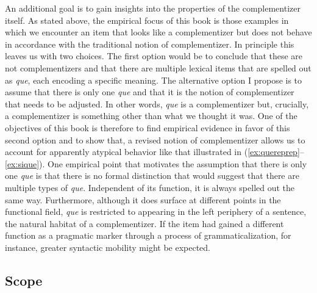 An additional goal is to gain insights into the properties of the complementizer itself. As stated above, the empirical focus of this book is those examples in which we encounter an item that looks like a complementizer but does not behave in accordance with the traditional notion of  complementizer. In principle this leaves us with  two choices. The first option would be to conclude that these are not complementizers and  that there are multiple lexical items that are spelled out as \emph{que}, each encoding a specific meaning. The alternative option I propose  is to assume that there is only one \emph{que}  and that it is the notion of complementizer that needs to be adjusted.  In other words,  \emph{que}  is a complementizer but, crucially, a complementizer is something other than what we thought it was. One of the objectives of this book is therefore to find empirical evidence in favor of this second option and to show that, a revised notion of complementizer allows us to account for  apparently atypical behavior like that illustrated in (\ref{ex:quereprep}--\ref{ex:sique}).  
One  empirical point that motivates the assumption that there is only one \emph{que} is that there is no  formal distinction that would suggest that there are multiple types of \emph{que}. Independent of its function, it is always spelled out the same way. Furthermore, although it does surface at different points in the functional field, \emph{que} is restricted to appearing in the left periphery of a sentence,  the natural habitat of a complementizer. If the item had gained a different function as a pragmatic marker through a process of grammaticalization, for instance,  greater syntactic mobility might be expected.
 


\subsection{Scope}

